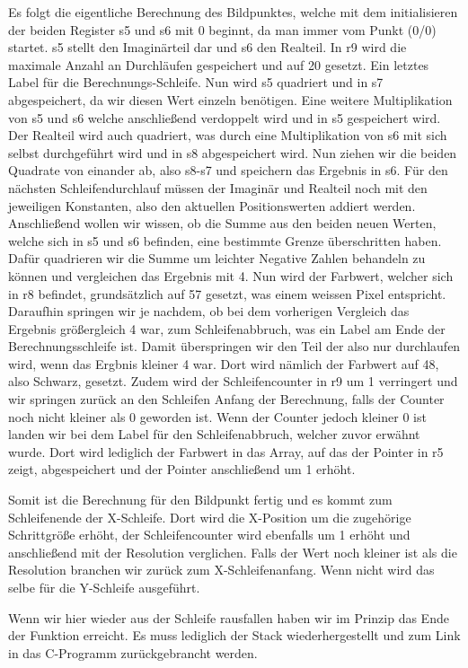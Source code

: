 \documentclass[11pt]{scrartcl}
\begin{document}
Es folgt die eigentliche Berechnung des Bildpunktes, welche mit dem initialisieren der beiden Register s5 und s6 mit 0 beginnt, da man immer vom Punkt (0/0) startet.
s5 stellt den Imaginärteil dar und s6 den Realteil.
In r9 wird die maximale Anzahl an Durchläufen gespeichert und auf 20 gesetzt.
Ein letztes Label für die Berechnungs-Schleife. Nun wird s5 quadriert und in s7 abgespeichert, da wir diesen Wert einzeln benötigen.
Eine weitere Multiplikation von s5 und s6 welche anschließend verdoppelt wird und in s5 gespeichert wird.
Der Realteil wird auch quadriert, was durch eine Multiplikation von s6 mit sich selbst durchgeführt wird und in s8 abgespeichert wird.
Nun ziehen wir die beiden Quadrate von einander ab, also s8-s7 und speichern das Ergebnis in s6.
Für den nächsten Schleifendurchlauf müssen der Imaginär und Realteil noch mit den jeweiligen Konstanten, also den aktuellen Positionswerten addiert werden.
Anschließend wollen wir wissen, ob die Summe aus den beiden neuen Werten, welche sich in s5 und s6 befinden, eine bestimmte Grenze überschritten haben.
Dafür quadrieren wir die Summe um leichter Negative Zahlen behandeln zu können und vergleichen das Ergebnis mit 4.
Nun wird der Farbwert, welcher sich in r8 befindet, grundsätzlich auf 57 gesetzt, was einem weissen Pixel entspricht.
Daraufhin springen wir je nachdem, ob bei dem vorherigen Vergleich das Ergebnis größergleich 4 war, zum Schleifenabbruch, was ein Label am Ende der Berechnungsschleife ist.
Damit überspringen wir den Teil der also nur durchlaufen wird, wenn das Ergbnis kleiner 4 war. Dort wird nämlich der Farbwert auf 48, also Schwarz, gesetzt.
Zudem wird der Schleifencounter in r9 um 1 verringert und wir springen zurück an den Schleifen Anfang der Berechnung, falls der Counter noch nicht kleiner als 0 geworden ist.
Wenn der Counter jedoch kleiner 0 ist landen wir bei dem Label für den Schleifenabbruch, welcher zuvor erwähnt wurde.
Dort wird lediglich der Farbwert in das Array, auf das der Pointer in r5 zeigt, abgespeichert und der Pointer anschließend um 1 erhöht.

Somit ist die Berechnung für den Bildpunkt fertig und es kommt zum Schleifenende der X-Schleife.
Dort wird die X-Position um die zugehörige Schrittgröße erhöht, der Schleifencounter wird ebenfalls um 1 erhöht und anschließend mit der Resolution verglichen.
Falls der Wert noch kleiner ist als die Resolution branchen wir zurück zum X-Schleifenanfang.
Wenn nicht wird das selbe für die Y-Schleife ausgeführt.

Wenn wir hier wieder aus der Schleife rausfallen haben wir im Prinzip das Ende der Funktion erreicht.
Es muss lediglich der Stack wiederhergestellt und zum Link in das C-Programm zurückgebrancht werden.
\end{document}
